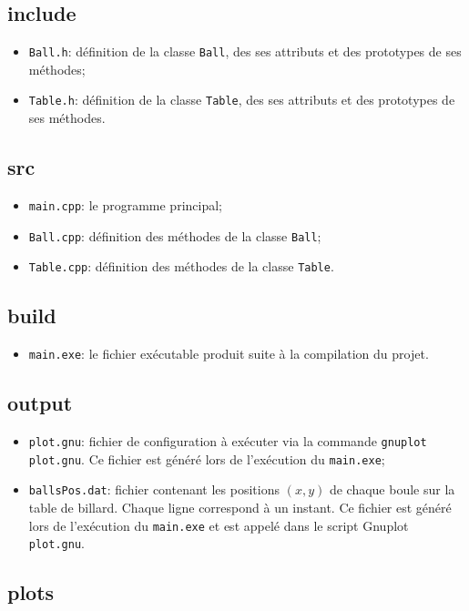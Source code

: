 \documentclass[12pt,a4paper]{article}
\newcommand{\myitem}{\item[$\triangleright$] }
\begin{document}
\subsection{include}

\begin{itemize}
    \myitem \texttt{Ball.h}: définition de la classe \texttt{Ball}, des ses attributs et des prototypes de ses méthodes;
    \myitem \texttt{Table.h}: définition de la classe \texttt{Table}, des ses attributs et des prototypes de ses méthodes.
\end{itemize}

\subsection{src}

\begin{itemize}
    \myitem \texttt{main.cpp}: le programme principal;
    \myitem \texttt{Ball.cpp}: définition des méthodes de la classe \texttt{Ball};
    \myitem \texttt{Table.cpp}: définition des méthodes de la classe \texttt{Table}.
\end{itemize}

\subsection{build}

\begin{itemize}
    \myitem \texttt{main.exe}: le fichier exécutable produit suite à la compilation du projet.
\end{itemize}

\subsection{output}

\begin{itemize}
    \myitem \texttt{plot.gnu}: fichier de configuration à exécuter via la commande \texttt{gnuplot plot.gnu}. Ce fichier est généré lors de l'exécution du \texttt{main.exe};
    \myitem \texttt{ballsPos.dat}: fichier contenant les positions $(x,y)$ de chaque boule sur la table de billard. Chaque ligne correspond à un instant. Ce fichier est généré lors de l'exécution du \texttt{main.exe} et est appelé dans le script Gnuplot \texttt{plot.gnu}.
\end{itemize}

\subsection{plots}
\end{document}
